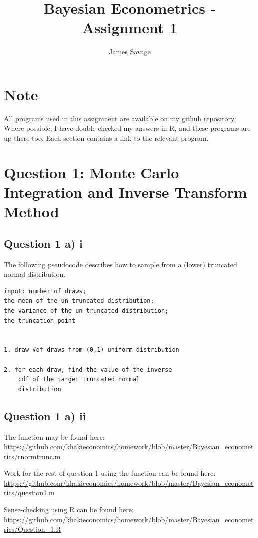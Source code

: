 \documentclass[a4paper,11pt]{article}
\title{Bayesian Econometrics - Assignment 1}
\author{James Savage}
\begin{document}
\maketitle

\section*{Note}
All programs used in this assignment are available on my \href{<www.github.com/khakieconomics>}{github repository}. Where possible, I have double-checked my answers in R, and these programs are up there too. Each section contains a link to the relevant program.



\section*{Question 1: Monte Carlo Integration and Inverse Transform Method}

\subsection*{Question 1 a) i}

The following pseudocode describes how to sample from a (lower) truncated normal distribution.

\begin{verbatim}
input: number of draws;
the mean of the un-truncated distribution;
the variance of the un-truncated distribution;
the truncation point


1. draw #of draws from (0,1) uniform distribution

2. for each draw, find the value of the inverse
    cdf of the target truncated normal
    distribution

\end{verbatim}

\subsection*{Question 1 a) ii}

The function may be found here:
\url{https://github.com/khakieconomics/homework/blob/master/Bayesian_econometrics/rnormtrunc.m}

Work for the rest of question 1 using the function can be found here:
\url{https://github.com/khakieconomics/homework/blob/master/Bayesian_econometrics/question1.m}

Sense-checking using R can be found here:
\url{https://github.com/khakieconomics/homework/blob/master/Bayesian_econometrics/Question_1.R}
\end{document}
